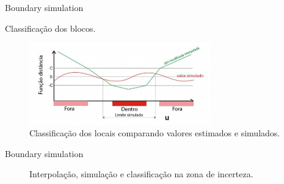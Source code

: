 \documentclass[aspectratio=169]{beamer}
\begin{document}
\begin{frame}{Boundary simulation}

	Classificação dos blocos.

	\begin{figure}[H]
	\caption{\label{class}Classificação dos locais comparando valores estimados e simulados.}
	\begin{center}
		\includegraphics[width=0.7\textwidth]{capitulo_2/classificacao.png}
	\end{center}
\end{figure}

\end{frame}

\begin{frame}{Boundary simulation}
	\begin{figure}[H] 
		\caption{Interpolação, simulação e classificação na zona de incerteza.} \label{cat1_bound_sim}
		\centering
	\end{figure}
\end{frame}
\end{document}
